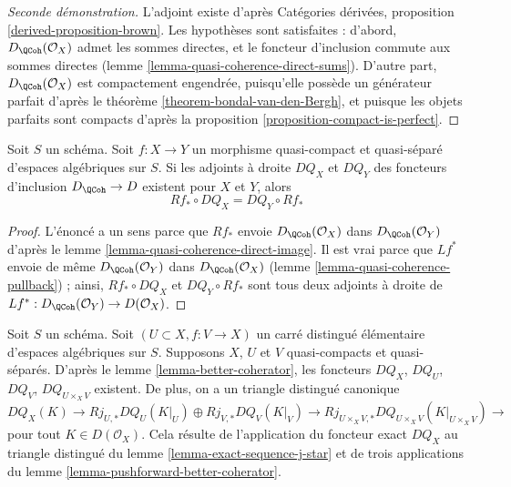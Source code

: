 \begin{proof}[Seconde démonstration]
L'adjoint existe d'après Catégories dérivées, proposition
\ref{derived-proposition-brown}. Les hypothèses sont satisfaites :
d'abord, $D_\QCoh(\mathcal{O}_X)$ admet les sommes directes,
et le foncteur d'inclusion commute aux sommes directes
(lemme \ref{lemma-quasi-coherence-direct-sums}).
D'autre part, $D_\QCoh(\mathcal{O}_X)$
est compactement engendrée, puisqu'elle possède un
générateur parfait d'après le théorème \ref{theorem-bondal-van-den-Bergh},
et puisque les objets parfaits sont compacts d'après la
proposition \ref{proposition-compact-is-perfect}.
\end{proof}

\begin{lemma}
\label{lemma-pushforward-better-coherator}
Soit $S$ un schéma.
Soit $f : X \to Y$ un morphisme quasi-compact et quasi-séparé
d'espaces algébriques sur $S$.
Si les adjoints à droite $DQ_X$ et $DQ_Y$
des foncteurs d'inclusion $D_\QCoh \to D$ existent pour $X$ et $Y$, alors
$$
Rf_* \circ DQ_X = DQ_Y \circ Rf_*
$$
\end{lemma}

\begin{proof}
L'énoncé a un sens parce que $Rf_*$ envoie
$D_\QCoh(\mathcal{O}_X)$ dans $D_\QCoh(\mathcal{O}_Y)$ d'après le
lemme \ref{lemma-quasi-coherence-direct-image}.
Il est vrai parce que $Lf^*$ envoie de même
$D_\QCoh(\mathcal{O}_Y)$ dans $D_\QCoh(\mathcal{O}_X)$
(lemme \ref{lemma-quasi-coherence-pullback}) ;
ainsi, $Rf_* \circ DQ_X$ et $DQ_Y \circ Rf_*$ sont tous deux
adjoints à droite de $Lf^* : D_\QCoh(\mathcal{O}_Y) \to D(\mathcal{O}_X)$.
\end{proof}

\begin{remark}
\label{remark-explain-consequence}
Soit $S$ un schéma. Soit $(U \subset X, f : V \to X)$ un
carré distingué élémentaire d'espaces algébriques sur $S$.
Supposons $X$, $U$ et $V$ quasi-compacts et quasi-séparés.
D'après le lemme \ref{lemma-better-coherator}, les foncteurs
$DQ_X$, $DQ_U$, $DQ_V$, $DQ_{U \times_X V}$ existent. De plus, on a un
triangle distingué canonique
$$
DQ_X(K) \to Rj_{U, *}DQ_U(K|_U) \oplus Rj_{V, *}DQ_V(K|_V)
\to Rj_{U \times_X V, *}DQ_{U \times_X V}(K|_{U \times_X V}) \to
$$
pour tout $K \in D(\mathcal{O}_X)$. Cela résulte de l'application du
foncteur exact $DQ_X$ au triangle distingué du
lemme \ref{lemma-exact-sequence-j-star}
et de trois applications du lemme \ref{lemma-pushforward-better-coherator}.
\end{remark}

